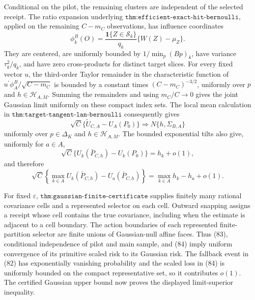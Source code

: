 Conditional on the pilot, the remaining clusters are independent of the selected receipt.  The ratio expansion underlying \(\texttt{thm:efficient-exact-hit-bernoulli}\), applied on the remaining \(C-m_C\) observations, has influence coordinates
\[
\phi_k^B(O)=\frac{\mathbf1\{Z\in\mathcal S_k\}}{q_k}
\{W(Z)-\mu_Z\}.
\]
They are centered, are uniformly bounded by \(1/\min_{p}(Bp)_k\), have variance \(\tau_k^2/q_k\), and have zero cross-products for distinct target slices.  For every fixed vector \(u\), the third-order Taylor remainder in the characteristic function of \(u^{\prime}\phi_A^B/\sqrt{C-m_C}\) is bounded by a constant times \((C-m_C)^{-3/2}\), uniformly over \(p\) and \(h\in\mathscr H_{A,M}\).  Summing the remainders and using \(m_C/C\to0\) gives the joint Gaussian limit uniformly on these compact index sets.  The local mean calculation in \(\texttt{thm:target-tangent-lan-bernoulli}\) consequently gives
\[
\sqrt C\{\widetilde U_{C,A}-U_A(P_0)\}
\Rightarrow N\{h,\Sigma_{B,A}\}                                 \tag{83}
\]
uniformly over \(p\in\Delta_K\) and \(h\in\mathscr H_{A,M}\).  The bounded exponential tilts also give, uniformly for \(a\in A\),
\[
\sqrt C\{U_k(\bar P_{C,h})-U_k(P_0)\}=h_k+o(1),
\]
and therefore
\[
\sqrt C\!\left\{\max_{k\in A}U_k(\bar P_{C,h})
-U_a(\bar P_{C,h})\right\}
=\max_{k\in A}h_k-h_a+o(1).                                     \tag{84}
\]

For fixed \(\varepsilon\), \(\texttt{thm:gaussian-finite-certificate}\) supplies finitely many rational covariance cells and a represented selector on each cell.  Outward snapping assigns a receipt whose cell contains the true covariance, including when the estimate is adjacent to a cell boundary.  The action boundaries of each represented finite-partition selector are finite unions of Gaussian-null affine faces.  Thus (83), conditional independence of pilot and main sample, and (84) imply uniform convergence of its primitive scaled risk to its Gaussian risk.  The fallback event in (82) has exponentially vanishing probability and the scaled loss in (84) is uniformly bounded on the compact representative set, so it contributes \(o(1)\).  The certified Gaussian upper bound now proves the displayed limit-superior inequality.


